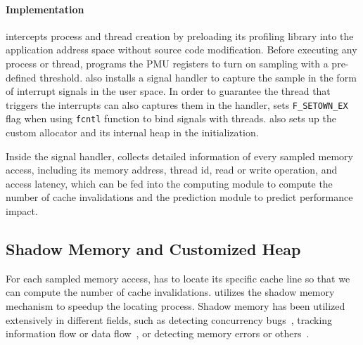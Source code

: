 \paragraph{Implementation} 
\cheetah{} intercepts process and thread creation by preloading its profiling library into the application address space without source code modification. Before executing any process or thread, \cheetah{} programs the PMU registers to turn on sampling with a pre-defined threshold. \cheetah{} also installs a signal handler to capture the sample in the form of interrupt signals in the user space. In order to guarantee the thread that triggers the interrupts can also captures them in the handler, 
\cheetah{} sets \texttt{F\_SETOWN\_EX} flag when using \texttt{fcntl} function to bind signals with threads. \cheetah{} also sets up the custom allocator and its internal heap in the initialization.

Inside the signal handler, \Cheetah{} collects detailed information of every sampled memory access, including its memory address, thread id, read or write operation, and access latency, which can be fed into the computing module to compute the number of cache invalidations and the prediction module to predict performance impact.

\subsection{Shadow Memory and Customized Heap}
\label{sec:shadow}

For each sampled memory access, \cheetah{} has to locate its specific cache line so that we can compute the number of cache invalidations. \Cheetah{} utilizes the shadow memory mechanism to speedup the locating process. Shadow memory has been utilized extensively in different fields, such as detecting concurrency bugs~\cite{Harrow:2000:RCM:645880.672080, helgrind, 404681, Savage:1997:EDD:268998.266641}, tracking information flow or data flow~\cite{Cheng:2006:TEF:1157733.1157903, Newsome05dynamictaint, Qin:2006:LLP:1194816.1194834}, or detecting memory errors or others~\cite{qinzhao, Hastings91purify:fast, Seward:2005:UVD:1247360.1247362, Narayanasamy:2006:ALO:1140277.1140303}.  

